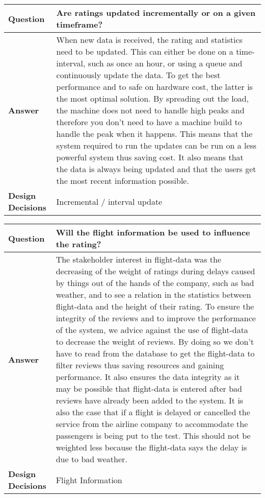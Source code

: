 \begin{longtable}{| l |  p{12cm} |}
\hline
\textbf{Question} & \textbf{Are ratings updated incrementally or on a given timeframe? } \\ \hline
\textbf{Answer} & When new data is received, the rating and statistics need to be updated. This can either be done on a time-interval, such as once an hour, or using a queue and continuously update the data. To get the best performance and to safe on hardware cost, the latter is the most optimal solution. By spreading out the load, the machine does not need to handle high peaks and therefore you don't need to have a machine build to handle the peak when it happens. This means that the system required to run the updates can be run on a less powerful system thus saving cost. It also means that the data is always being updated and that the users get the most recent information possible.
 \\ \hline
\textbf{Design Decisions} & Incremental / interval update \\ \hline
\end{longtable}

\begin{longtable}{| l |  p{12cm} |}
\hline
\textbf{Question} & \textbf{Will the flight information be used to influence the rating?} \\ \hline
\textbf{Answer} & The stakeholder interest in flight-data was the decreasing of the weight of ratings during delays caused by things out of the hands of the company, such as bad weather, and to see a relation in the statistics between flight-data and the height of their rating. To ensure the integrity of the reviews and to improve the performance of the system, we advice against the use of flight-data to decrease the weight of reviews. By doing so we don't have to read from the database to get the flight-data to filter reviews thus saving resources and gaining performance. It also ensures the data integrity as it may be possible that flight-data is entered after bad reviews have already been added to the system. It is also the case that if a flight is delayed or cancelled the service from the airline company to accommodate the passengers is being put to the test. This should not be weighted less because the flight-data says the delay is due to bad weather.
 \\ \hline
\textbf{Design Decisions} & Flight Information \\ \hline
\end{longtable}
